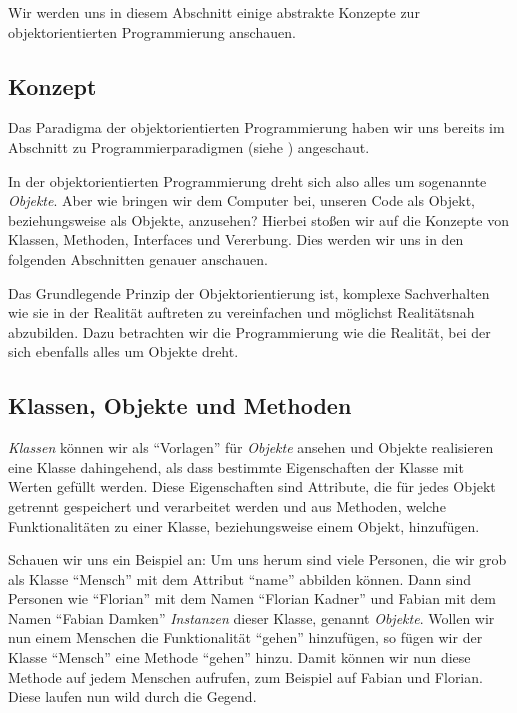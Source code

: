 Wir werden uns in diesem Abschnitt einige abstrakte Konzepte zur objektorientierten Programmierung anschauen.

\subsection{Konzept}
	Das Paradigma der objektorientierten Programmierung haben wir uns bereits im Abschnitt zu Programmierparadigmen (siehe ) angeschaut.
	
	In der objektorientierten Programmierung dreht sich also alles um sogenannte \textit{Objekte}. Aber wie bringen wir dem Computer bei, unseren Code als Objekt, beziehungsweise als Objekte, anzusehen? Hierbei stoßen wir auf die Konzepte von Klassen, Methoden, Interfaces und Vererbung. Dies werden wir uns in den folgenden Abschnitten genauer anschauen.
	
	Das Grundlegende Prinzip der Objektorientierung ist, komplexe Sachverhalten wie sie in der Realität auftreten zu vereinfachen und möglichst Realitätsnah abzubilden. Dazu betrachten wir die Programmierung wie die Realität, bei der sich ebenfalls alles um Objekte dreht.

\subsection{Klassen, Objekte und Methoden} \imperativeMark \oopMark
	
	\textit{Klassen} können wir als \enquote{Vorlagen} für \textit{Objekte} ansehen und Objekte realisieren eine Klasse dahingehend, als dass bestimmte Eigenschaften der Klasse mit Werten gefüllt werden. Diese Eigenschaften sind Attribute, die für jedes Objekt getrennt gespeichert und verarbeitet werden und aus Methoden, welche Funktionalitäten zu einer Klasse, beziehungsweise einem Objekt, hinzufügen.
	
	Schauen wir uns ein Beispiel an: Um uns herum sind viele Personen, die wir grob als Klasse \enquote{Mensch} mit dem Attribut \enquote{name} abbilden können. Dann sind Personen wie \enquote{Florian} mit dem Namen \enquote{Florian Kadner} und Fabian mit dem Namen \enquote{Fabian Damken} \textit{Instanzen} dieser Klasse, genannt \textit{Objekte}. Wollen wir nun einem Menschen die Funktionalität \enquote{gehen} hinzufügen, so fügen wir der Klasse \enquote{Mensch} eine Methode \enquote{gehen} hinzu. Damit können wir nun diese Methode auf jedem Menschen aufrufen, zum Beispiel auf Fabian und Florian. Diese laufen nun wild durch die Gegend.
	
